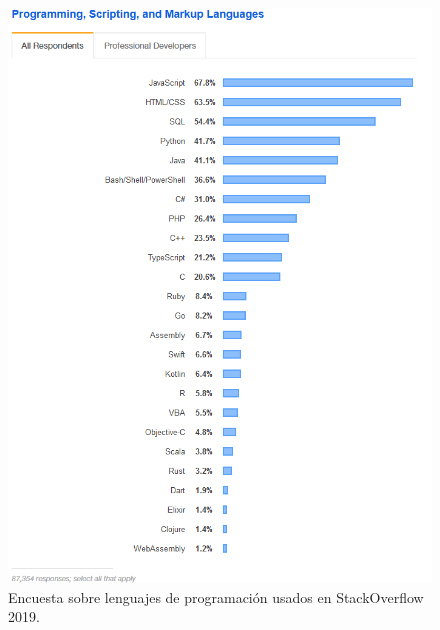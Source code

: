 \begin{figure}
    \centering
    \includegraphics[width=1\textwidth]{images/chapter1/stackoverflow_language.png}
    \caption{Encuesta sobre lenguajes de programación usados en StackOverflow 2019.}
    \label{fig:Encuesta sobre lenguajes de programación en StackOverflow 2019}
\end{figure}

